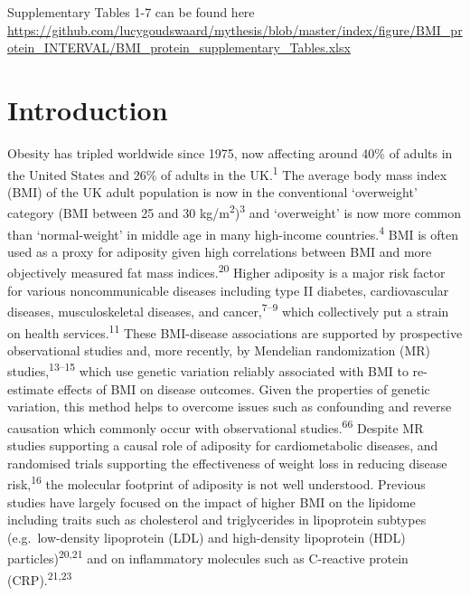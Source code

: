 \documentclass[11pt,twoside]{bristolthesis}
\begin{document}
Supplementary Tables 1-7 can be found here \url{https://github.com/lucygoudswaard/mythesis/blob/master/index/figure/BMI_protein_INTERVAL/BMI_protein_supplementary_Tables.xlsx}

\hypertarget{introduction-1}{%
\section{Introduction}\label{introduction-1}}

Obesity has tripled worldwide since 1975, now affecting around 40\% of adults in the United States and 26\% of adults in the UK.\textsuperscript{1} The average body mass index (BMI) of the UK adult population is now in the conventional `overweight' category (BMI between 25 and 30 kg/m\textsuperscript{2})\textsuperscript{3} and `overweight' is now more common than `normal-weight' in middle age in many high-income countries.\textsuperscript{4} BMI is often used as a proxy for adiposity given high correlations between BMI and more objectively measured fat mass indices.\textsuperscript{20} Higher adiposity is a major risk factor for various noncommunicable diseases including type II diabetes, cardiovascular diseases, musculoskeletal diseases, and cancer,\textsuperscript{7--9} which collectively put a strain on health services.\textsuperscript{11} These BMI-disease associations are supported by prospective observational studies and, more recently, by Mendelian randomization (MR) studies,\textsuperscript{13--15} which use genetic variation reliably associated with BMI to re-estimate effects of BMI on disease outcomes. Given the properties of genetic variation, this method helps to overcome issues such as confounding and reverse causation which commonly occur with observational studies.\textsuperscript{66}
Despite MR studies supporting a causal role of adiposity for cardiometabolic diseases, and randomised trials supporting the effectiveness of weight loss in reducing disease risk,\textsuperscript{16} the molecular footprint of adiposity is not well understood. Previous studies have largely focused on the impact of higher BMI on the lipidome including traits such as cholesterol and triglycerides in lipoprotein subtypes (e.g.~low-density lipoprotein (LDL) and high-density lipoprotein (HDL) particles)\textsuperscript{20,21} and on inflammatory molecules such as C-reactive protein (CRP).\textsuperscript{21,23}
\end{document}
